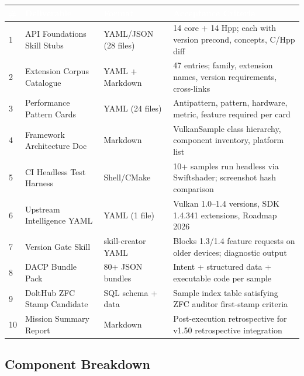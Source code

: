 \documentclass[11pt,letterpaper]{article}
\newcommand{\tableheader}[1]{\textbf{\sffamily\textcolor{white}{#1}}}
\begin{document}
\begin{center}
\begin{tabularx}{\textwidth}{C{0.5cm}L{4.5cm}L{3cm}X}
\toprule
{}
\tableheader{\#} & \tableheader{Deliverable} & \tableheader{Format} & \tableheader{Acceptance Criteria} \\
 & API Foundations Skill Stubs & YAML/JSON (28 files) & 14 core + 14 Hpp; each with version precond, concepts, C/Hpp diff \\
2 & Extension Corpus Catalogue & YAML + Markdown & 47 entries; family, extension names, version requirements, cross-links \\
3 & Performance Pattern Cards & YAML (24 files) & Antipattern, pattern, hardware, metric, feature required per card \\
4 & Framework Architecture Doc & Markdown & VulkanSample class hierarchy, component inventory, platform list \\
5 & CI Headless Test Harness & Shell/CMake & 10+ samples run headless via Swiftshader; screenshot hash comparison \\
6 & Upstream Intelligence YAML & YAML (1 file) & Vulkan 1.0--1.4 versions, SDK 1.4.341 extensions, Roadmap 2026 \\
7 & Version Gate Skill & skill-creator YAML & Blocks 1.3/1.4 feature requests on older devices; diagnostic output \\
8 & DACP Bundle Pack & 80+ JSON bundles & Intent + structured data + executable code per sample \\
9 & DoltHub ZFC Stamp Candidate & SQL schema + data & Sample index table satisfying ZFC auditor first-stamp criteria \\
10 & Mission Summary Report & Markdown & Post-execution retrospective for v1.50 retrospective integration \\
\bottomrule
\end{tabularx}
\end{center}

\subsection{Component Breakdown}
\end{document}
